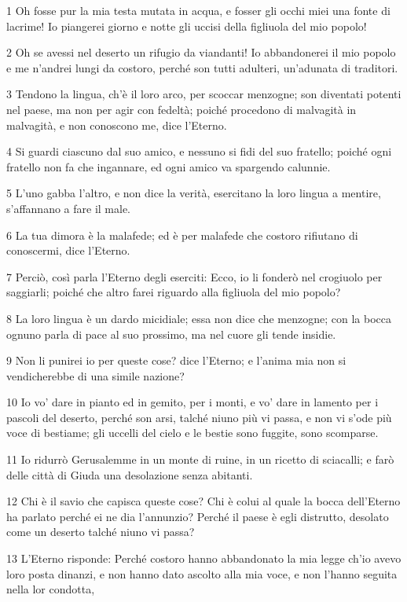 \par 1 Oh fosse pur la mia testa mutata in acqua, e fosser gli occhi miei una fonte di lacrime! Io piangerei giorno e notte gli uccisi della figliuola del mio popolo!
\par 2 Oh se avessi nel deserto un rifugio da viandanti! Io abbandonerei il mio popolo e me n'andrei lungi da costoro, perché son tutti adulteri, un'adunata di traditori.
\par 3 Tendono la lingua, ch'è il loro arco, per scoccar menzogne; son diventati potenti nel paese, ma non per agir con fedeltà; poiché procedono di malvagità in malvagità, e non conoscono me, dice l'Eterno.
\par 4 Si guardi ciascuno dal suo amico, e nessuno si fidi del suo fratello; poiché ogni fratello non fa che ingannare, ed ogni amico va spargendo calunnie.
\par 5 L'uno gabba l'altro, e non dice la verità, esercitano la loro lingua a mentire, s'affannano a fare il male.
\par 6 La tua dimora è la malafede; ed è per malafede che costoro rifiutano di conoscermi, dice l'Eterno.
\par 7 Perciò, così parla l'Eterno degli eserciti: Ecco, io li fonderò nel crogiuolo per saggiarli; poiché che altro farei riguardo alla figliuola del mio popolo?
\par 8 La loro lingua è un dardo micidiale; essa non dice che menzogne; con la bocca ognuno parla di pace al suo prossimo, ma nel cuore gli tende insidie.
\par 9 Non li punirei io per queste cose? dice l'Eterno; e l'anima mia non si vendicherebbe di una simile nazione?
\par 10 Io vo' dare in pianto ed in gemito, per i monti, e vo' dare in lamento per i pascoli del deserto, perché son arsi, talché niuno più vi passa, e non vi s'ode più voce di bestiame; gli uccelli del cielo e le bestie sono fuggite, sono scomparse.
\par 11 Io ridurrò Gerusalemme in un monte di ruine, in un ricetto di sciacalli; e farò delle città di Giuda una desolazione senza abitanti.
\par 12 Chi è il savio che capisca queste cose? Chi è colui al quale la bocca dell'Eterno ha parlato perché ei ne dia l'annunzio? Perché il paese è egli distrutto, desolato come un deserto talché niuno vi passa?
\par 13 L'Eterno risponde: Perché costoro hanno abbandonato la mia legge ch'io avevo loro posta dinanzi, e non hanno dato ascolto alla mia voce, e non l'hanno seguita nella lor condotta,
